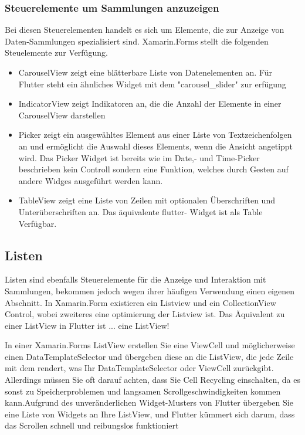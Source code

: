 \subsubsection{Steuerelemente um Sammlungen anzuzeigen}

Bei diesen Steuerelementen handelt es sich um Elemente, die zur Anzeige von Daten-Sammlungen spezialisiert sind.  Xamarin.Forms stellt die folgenden Steuelemente zur Verfügung.

\begin{itemize}
\setlength\itemsep{-0.6em}
 \item CarouselView zeigt eine blätterbare Liste von Datenelementen an.  Für Flutter steht ein ähnliches Widget mit dem "carousel\_slider" zur erfügung
 \item IndicatorView zeigt Indikatoren an, die die Anzahl der Elemente in einer CarouselView darstellen
 \item Picker zeigt ein ausgewähltes Element aus einer Liste von Textzeichenfolgen an und ermöglicht die Auswahl dieses Elements, wenn die Ansicht angetippt wird.  Das Picker Widget ist bereits wie im Date,- und Time-Picker beschrieben kein Controll sondern eine Funktion, welches durch Gesten auf andere Widges ausgeführt werden kann. 
 \item TableView zeigt eine Liste von Zeilen mit optionalen Überschriften und Unterüberschriften an.  Das äquivalente flutter- Widget ist als Table Verfügbar.
\end{itemize}

\subsection{Listen}

Listen sind ebenfalls Steuerelemente für die Anzeige und Interaktion mit Sammlungen,  bekommen jedoch wegen ihrer häufigen Verwendung einen eigenen Abschnitt. In Xamarin.Form existieren ein Listview und ein CollectionView Control,  wobei zweiteres eine optimierung der Listview ist.  Das Äquivalent zu einer ListView in Flutter ist ... eine ListView!

In einer Xamarin.Forms ListView erstellen Sie eine ViewCell und möglicherweise einen DataTemplateSelector und übergeben diese an die ListView, die jede Zeile mit dem rendert, was Ihr DataTemplateSelector oder ViewCell zurückgibt. Allerdings müssen Sie oft darauf achten, dass Sie Cell Recycling einschalten, da es sonst zu Speicherproblemen und langsamen Scrollgeschwindigkeiten kommen kann.Aufgrund des unveränderlichen Widget-Musters von Flutter übergeben Sie eine Liste von Widgets an Ihre ListView, und Flutter kümmert sich darum, dass das Scrollen schnell und reibungslos funktioniert

